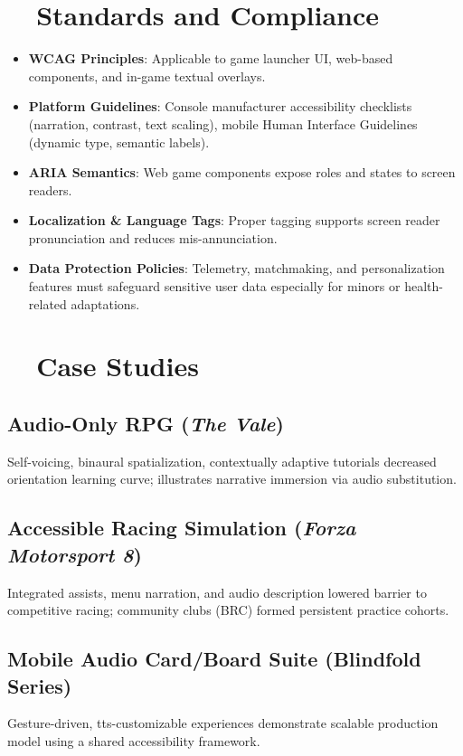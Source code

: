 \section{~~Standards and Compliance}
\label{sec:gaming-standards}
\begin{itemize}
	\item \textbf{WCAG Principles}: Applicable to game launcher UI, web-based components, and in-game textual overlays.
	\item \textbf{Platform Guidelines}: Console manufacturer accessibility checklists (narration, contrast, text scaling), mobile Human Interface Guidelines (dynamic type, semantic labels).
	\item \textbf{ARIA Semantics}: Web game components expose roles and states to screen readers.
	\item \textbf{Localization \& Language Tags}: Proper tagging supports screen reader pronunciation and reduces mis-annunciation.
	\item \textbf{Data Protection Policies}: Telemetry, matchmaking, and personalization features must safeguard sensitive user data especially for minors or health-related adaptations.
\end{itemize}

\section{~~Case Studies}
\label{sec:gaming-case-studies}
\subsection*{Audio-Only RPG (\textit{The Vale})}
Self-voicing, binaural spatialization, contextually adaptive tutorials decreased orientation learning curve; illustrates narrative immersion via audio substitution\supercite{AFBValeReview}.

\subsection*{Accessible Racing Simulation (\textit{Forza Motorsport 8})}
Integrated  assists, menu narration, and audio description lowered barrier to competitive racing; community clubs (BRC) formed persistent practice cohorts\supercite{LudaccessList,BlindGamingClub}.

\subsection*{Mobile Audio Card/Board Suite (Blindfold Series)}
Gesture-driven, \gls{tts}-customizable experiences demonstrate scalable production model using a shared accessibility framework\supercite{AppleStoreSolitaire}.

